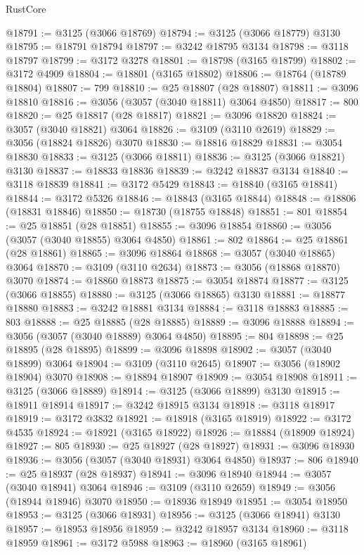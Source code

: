 \begin{lexlean}{RustCore}
\begin{coremodule}
@18791 := @3125 (@3066 @18769)
@18794 := @3125 (@3066 @18779) @3130
@18795 := @18791 @18794
@18797 := @3242 @18795 @3134
@18798 := @3118 @18797
@18799 := @3172 @3278
@18801 := @18798 (@3165 @18799)
@18802 := @3172 @4909
@18804 := @18801 (@3165 @18802)
@18806 := @18764 (@18789 @18804)
@18807 := 799
@18810 := @25 @18807 (@28 @18807)
@18811 := @3096 @18810
@18816 := @3056 (@3057 (@3040 @18811) @3064 @4850)
@18817 := 800
@18820 := @25 @18817 (@28 @18817)
@18821 := @3096 @18820
@18824 := @3057 (@3040 @18821) @3064
@18826 := @3109 (@3110 @2619)
@18829 := @3056 (@18824 @18826) @3070
@18830 := @18816 @18829
@18831 := @3054 @18830
@18833 := @3125 (@3066 @18811)
@18836 := @3125 (@3066 @18821) @3130
@18837 := @18833 @18836
@18839 := @3242 @18837 @3134
@18840 := @3118 @18839
@18841 := @3172 @5429
@18843 := @18840 (@3165 @18841)
@18844 := @3172 @5326
@18846 := @18843 (@3165 @18844)
@18848 := @18806 (@18831 @18846)
@18850 := @18730 (@18755 @18848)
@18851 := 801
@18854 := @25 @18851 (@28 @18851)
@18855 := @3096 @18854
@18860 := @3056 (@3057 (@3040 @18855) @3064 @4850)
@18861 := 802
@18864 := @25 @18861 (@28 @18861)
@18865 := @3096 @18864
@18868 := @3057 (@3040 @18865) @3064
@18870 := @3109 (@3110 @2634)
@18873 := @3056 (@18868 @18870) @3070
@18874 := @18860 @18873
@18875 := @3054 @18874
@18877 := @3125 (@3066 @18855)
@18880 := @3125 (@3066 @18865) @3130
@18881 := @18877 @18880
@18883 := @3242 @18881 @3134
@18884 := @3118 @18883
@18885 := 803
@18888 := @25 @18885 (@28 @18885)
@18889 := @3096 @18888
@18894 := @3056 (@3057 (@3040 @18889) @3064 @4850)
@18895 := 804
@18898 := @25 @18895 (@28 @18895)
@18899 := @3096 @18898
@18902 := @3057 (@3040 @18899) @3064
@18904 := @3109 (@3110 @2645)
@18907 := @3056 (@18902 @18904) @3070
@18908 := @18894 @18907
@18909 := @3054 @18908
@18911 := @3125 (@3066 @18889)
@18914 := @3125 (@3066 @18899) @3130
@18915 := @18911 @18914
@18917 := @3242 @18915 @3134
@18918 := @3118 @18917
@18919 := @3172 @3832
@18921 := @18918 (@3165 @18919)
@18922 := @3172 @4535
@18924 := @18921 (@3165 @18922)
@18926 := @18884 (@18909 @18924)
@18927 := 805
@18930 := @25 @18927 (@28 @18927)
@18931 := @3096 @18930
@18936 := @3056 (@3057 (@3040 @18931) @3064 @4850)
@18937 := 806
@18940 := @25 @18937 (@28 @18937)
@18941 := @3096 @18940
@18944 := @3057 (@3040 @18941) @3064
@18946 := @3109 (@3110 @2659)
@18949 := @3056 (@18944 @18946) @3070
@18950 := @18936 @18949
@18951 := @3054 @18950
@18953 := @3125 (@3066 @18931)
@18956 := @3125 (@3066 @18941) @3130
@18957 := @18953 @18956
@18959 := @3242 @18957 @3134
@18960 := @3118 @18959
@18961 := @3172 @5988
@18963 := @18960 (@3165 @18961)

\end{coremodule}
\end{lexlean}
